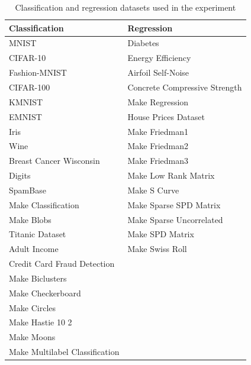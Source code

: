 \documentclass[a4paper,12pt]{article}
\begin{document}
\begin{table}[ht]
  \centering
  \begin{tabular}{|p{}|p{}|}
    \hline
    \textbf{Classification} & \textbf{Regression} \\
    \hline
    MNIST & Diabetes \\
    CIFAR-10 & Energy Efficiency \\
    Fashion-MNIST & Airfoil Self-Noise \\
    CIFAR-100 & Concrete Compressive Strength \\
    KMNIST & Make Regression \\
    EMNIST & House Prices Dataset \\
    Iris & Make Friedman1 \\
    Wine & Make Friedman2 \\
    Breast Cancer Wisconsin & Make Friedman3 \\
    Digits & Make Low Rank Matrix \\
    SpamBase & Make S Curve \\
    Make Classification & Make Sparse SPD Matrix \\
    Make Blobs & Make Sparse Uncorrelated \\
    Titanic Dataset & Make SPD Matrix \\
    Adult Income & Make Swiss Roll \\
    Credit Card Fraud Detection & \\
    Make Biclusters & \\
    Make Checkerboard & \\
    Make Circles & \\
    Make Hastie 10 2 & \\
    Make Moons & \\
    Make Multilabel Classification & \\
    \hline
  \end{tabular}
  \caption{Classification and regression datasets used in the experiment}
\end{table}
\end{document}
